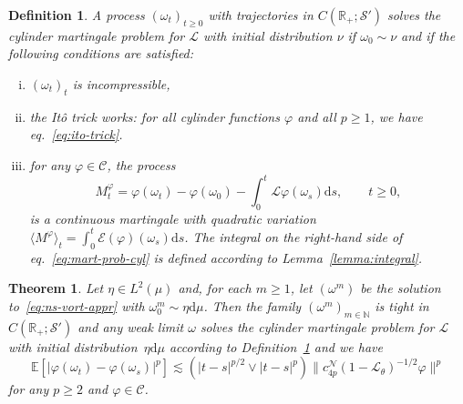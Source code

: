\documentclass[10pt]{article}
\newcommand{\mathd}{\mathrm{d}}
\newcommand{\tmem}[1]{{\em #1\/}}
\newenvironment{enumerateroman}{\begin{enumerate}[i.] }{\end{enumerate}}
\newtheorem{definition}{Definition}
\newtheorem{theorem}{Theorem}
\begin{document}
\begin{definition}
  \label{def:martpb-cyl}A process $(\omega_t)_{t \geqslant 0}$ with
  trajectories in $C (\mathbb{R}_+ ; \mathcal{S}')$ solves the {\tmem{cylinder
  martingale problem for $\mathcal{L}$ with initial distribution $\nu$}} if
  $\omega_0 \sim \nu$ and if the following conditions are satisfied:
  \begin{enumerateroman}
    \item $(\omega_t)_t$ is incompressible,
    
    \item the It{\^o} trick works: for all cylinder functions $\varphi$ and
    all $p \geqslant 1$, we have eq.~{\eqref{eq:ito-trick}}.
    
    \item for any $\varphi \in \mathcal{C}$, the process
    \begin{equation}
      M_t^{\varphi} = \varphi (\omega_t) - \varphi (\omega_0) - \int_0^t
      \mathcal{L} \varphi (\omega_s) \mathd s, \qquad t \geqslant 0,
      \label{eq:mart-prob-cyl}
    \end{equation}
    is a continuous martingale with quadratic variation $\langle M^{\varphi}
    \rangle_t = \int_0^t \mathcal{E} (\varphi) (\omega_s) \mathd s$. The
    integral on the right-hand side of eq.~{\eqref{eq:mart-prob-cyl}} is
    defined according to Lemma~\ref{lemma:integral}.
  \end{enumerateroman}
\end{definition}

\begin{theorem}
  \label{thm:existence-cyl-martingalepb}Let $\eta \in L^2 (\mu)$ and, for each
  $m \geqslant 1$, let $(\omega^m)$ be the solution
  to~{\eqref{eq:ns-vort-appr}} with $\omega^m_0 \sim \eta \mathd \mu$. Then
  the family $(\omega^m)_{m \in \mathbb{N}}$ is tight in $C (\mathbb{R}_+ ;
  \mathcal{S}')$ and any weak limit $\omega$ solves the cylinder martingale
  problem for $\mathcal{L}$ with initial distribution~$\eta \mathd \mu$
  according to Definition~\ref{def:martpb-cyl} and we have
  \begin{equation}
    \mathbb{E} [| \varphi (\omega_t) - \varphi (\omega_s) |^p] \lesssim (| t -
    s |^{p / 2} \vee | t - s |^p) \| c_{4 p}^{\mathcal{N}} (1
    -\mathcal{L}_{\theta})^{- 1 / 2} \varphi \|^p \label{eq:mod-cont}
  \end{equation}
  for any $p \geqslant 2$ and $\varphi \in \mathcal{C}$.
\end{theorem}
\end{document}
